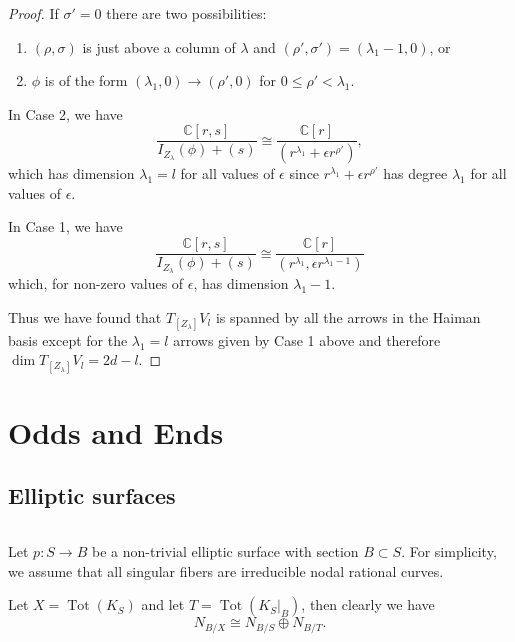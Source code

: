 \documentclass[12pt]{amsart}
\theoremstyle{definition}
\newcommand{\CC} {\mathbb{C}}          %
\newcommand{\Tot}{\operatorname{Tot}}
\newcommand{\presectionspace}{\vspace{0.2cm}} %
\newcommand{\SubSecSpace}{$\,$\vspace{0.2cm}\par } %
\begin{document}
\begin{proof}
If $\sigma '=0$ there are two possibilities:
\begin{enumerate}
\item $(\rho ,\sigma )$ is just above a column of $\lambda$ and $(\rho
',\sigma ')=(\lambda_{1}-1,0)$, or
\item $\phi$ is of the form $(\lambda_{1},0)\to (\rho ',0)$ for $0\leq
\rho '<\lambda_{1}$. 
\end{enumerate}
In Case 2, we have 
\[
\frac{\CC [r,s]}{I_{Z_{\lambda}}(\phi ) + (s)} \cong \frac{\CC
[r]}{(r^{\lambda_{1}}+\epsilon r^{\rho '})},
\]
which has dimension $\lambda_{1}=l$ for all values of $\epsilon$ since
$r^{\lambda_{1}}+\epsilon r^{\rho '}$ has degree $\lambda_{1}$ for all
values of $\epsilon$.

In Case 1, we have
\[
\frac{\CC [r,s]}{I_{Z_{\lambda}}(\phi ) + (s)} \cong \frac{\CC
[r]}{(r^{\lambda_{1}},\epsilon  r^{\lambda_{1}-1})}
\]
which, for non-zero values of $\epsilon$, has dimension
$\lambda_{1}-1$.

Thus we have found that $T_{[Z_{\lambda}]}V_{l}$ is spanned by all the
arrows in the Haiman basis except for the $\lambda_{1}=l$ arrows given
by Case 1 above and therefore $\dim T_{[Z_{\lambda}]}V_{l} = 2d-l$.
\end{proof}



\presectionspace
\appendix
\section{Odds and Ends}\label{appendix: odds and ends}

\subsection{Elliptic surfaces}\label{subsec: elliptic surfs}\SubSecSpace

Let $p : S \rightarrow B$ be a non-trivial elliptic surface with
section $B \subset S$. For simplicity, we assume that all singular
fibers are irreducible nodal rational curves.

Let $X=\Tot (K_{S})$ and let $T=\Tot (K_{S}|_B)$, then clearly we have
\[
N_{B/X}\cong N_{B/S}\oplus N_{B/T}. 
\]
\end{document}
